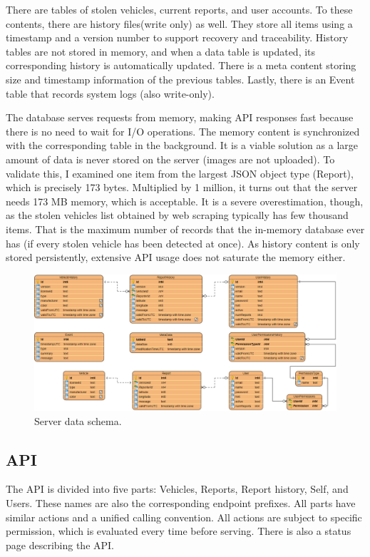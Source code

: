 There are tables of stolen vehicles, current reports, and user accounts. To these contents, there are history files(write only) as well. They store all items using a timestamp and a version number to support recovery and traceability. History tables are not stored in memory, and when a data table is updated, its corresponding history is automatically updated. There is a meta content storing size and timestamp information of the previous tables. Lastly, there is an Event table that records system logs (also write-only).

The database serves requests from memory, making API responses fast because there is no need to wait for I/O operations. The memory content is synchronized with the corresponding table in the background. It is a viable solution as a large amount of data is never stored on the server (images are not uploaded). To validate this, I examined one item from the largest JSON object type (Report), which is precisely 173 bytes. Multiplied by 1 million, it turns out that the server needs 173 MB memory, which is acceptable. It is a severe overestimation, though, as the stolen vehicles list obtained by web scraping typically has few thousand items. That is the maximum number of records that the in-memory database ever has (if every stolen vehicle has been detected at once). As history content is only stored persistently, extensive API usage does not saturate the memory either.

\begin{figure}[htb]
 \centerline{\includegraphics[width=1.0\columnwidth]{.//Figure/System/ServerData.PNG}}
 \caption{Server data schema.}
 \label{fig:simple}
\end{figure}

\subsection{API}

The API is divided into five parts: Vehicles, Reports, Report history, Self, and Users. These names are also the corresponding endpoint prefixes. All parts have similar actions and a unified calling convention. All actions are subject to specific permission, which is evaluated every time before serving. There is also a status page describing the API.

